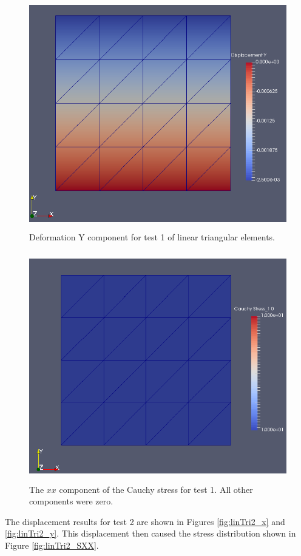 \documentclass[a4paper, 12pt]{article}
\begin{document}
\begin{figure}[H]
  \centering
  \includegraphics[width=13cm, height=10cm]{tri_4_t1_disp_Y}
  \caption{Deformation Y component for test 1 of linear 
            triangular elements.}
  \label{fig:linTri1_y}
\end{figure}

\begin{figure}[H]
  \centering
  \includegraphics[width=13cm, height=10cm]{tri_4_t1_Sxx}
  \caption{The $xx$ component of the Cauchy stress for test 1.
            All other components were zero.}
  \label{fig:linTri1_SXX}
\end{figure}

The displacement results for test 2 are shown in 
Figures \ref{fig:linTri2_x} and \ref{fig:linTri2_y}.
This displacement then caused the stress distribution 
shown in Figure \ref{fig:linTri2_SXX}.
\end{document}
